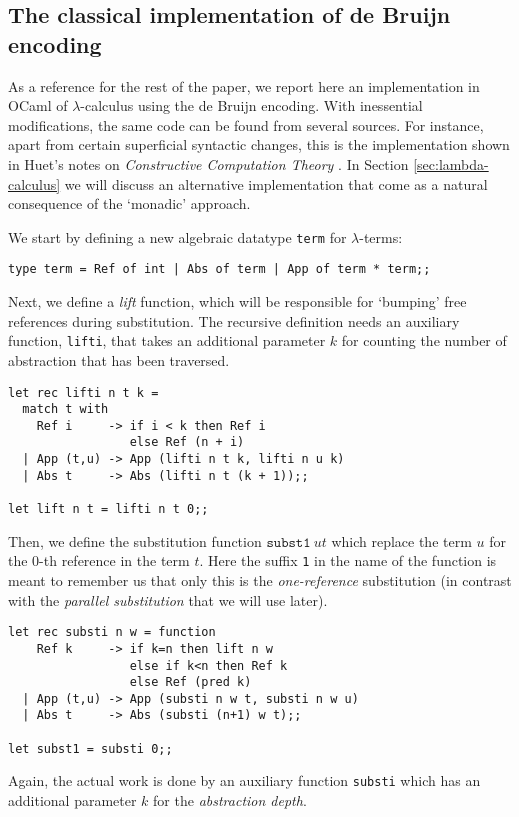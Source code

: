 \documentclass[a4paper,twoside,12pt]{article}
\theoremstyle{definition}
\theoremstyle{remark}
\theoremstyle{example}
\begin{document}
\subsection{The classical implementation of de Bruijn encoding}
\label{sec:classical-de-bruijn}

As a reference for the rest of the paper, we report here an
implementation in OCaml of $\lambda$-calculus using the de Bruijn
encoding.  With inessential modifications, the same code can be found
from several sources.  For instance, apart from certain superficial
syntactic changes, this is the implementation shown in Huet's notes on
\emph{Constructive Computation Theory} \cite[Section 1.4.2,
p.~15]{Huet-1992}.  In Section \ref{sec:lambda-calculus} we will
discuss an alternative implementation that come as a natural
consequence of the `monadic' approach.

We start by defining a new algebraic datatype \texttt{term} for
$\lambda$-terms:
\begin{verbatim}
type term = Ref of int | Abs of term | App of term * term;;
\end{verbatim}
Next, we define a \emph{lift} function, which will be responsible for
`bumping' free references during substitution.  The recursive
definition needs an auxiliary function, \texttt{lifti}, that takes an
additional parameter $k$ for counting the number of abstraction that
has been traversed.
\begin{verbatim}
let rec lifti n t k =
  match t with
    Ref i     -> if i < k then Ref i
                 else Ref (n + i)
  | App (t,u) -> App (lifti n t k, lifti n u k)
  | Abs t     -> Abs (lifti n t (k + 1));;

let lift n t = lifti n t 0;;
\end{verbatim}
Then, we define the substitution function $\mathtt{subst1}\ u t$ which
replace the term $u$ for the $0$-th reference in the term $t$.  Here
the suffix \texttt{1} in the name of the function is meant to remember
us that only this is the \emph{one-reference} substitution (in
contrast with the \emph{parallel substitution} that we will use
later).
\begin{verbatim}
let rec substi n w = function
    Ref k     -> if k=n then lift n w
                 else if k<n then Ref k
                 else Ref (pred k)
  | App (t,u) -> App (substi n w t, substi n w u)
  | Abs t     -> Abs (substi (n+1) w t);;

let subst1 = substi 0;;
\end{verbatim}
Again, the actual work is done by an auxiliary function
\texttt{substi} which has an additional parameter $k$ for
the \emph{abstraction depth}.
\end{document}
